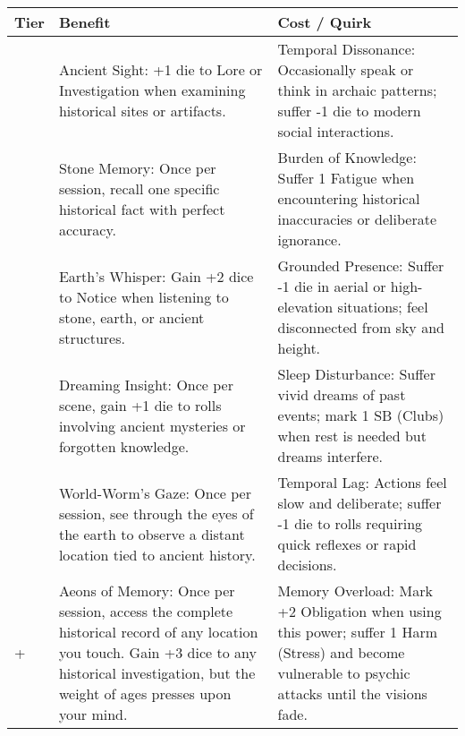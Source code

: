 \begin{longtable}{>{\raggedright\arraybackslash}p{1cm} p{5cm} p{5cm}}
\toprule
\textbf{Tier} & \textbf{Benefit} & \textbf{Cost / Quirk} \\
\midrule
1 & Ancient Sight: +1 die to Lore or Investigation when examining historical sites or artifacts. & Temporal Dissonance: Occasionally speak or think in archaic patterns; suffer -1 die to modern social interactions. \\
\midrule
2 & Stone Memory: Once per session, recall one specific historical fact with perfect accuracy. & Burden of Knowledge: Suffer 1 Fatigue when encountering historical inaccuracies or deliberate ignorance. \\
\midrule
3 & Earth's Whisper: Gain +2 dice to Notice when listening to stone, earth, or ancient structures. & Grounded Presence: Suffer -1 die in aerial or high-elevation situations; feel disconnected from sky and height. \\
\midrule
4 & Dreaming Insight: Once per scene, gain +1 die to rolls involving ancient mysteries or forgotten knowledge. & Sleep Disturbance: Suffer vivid dreams of past events; mark 1 SB (Clubs) when rest is needed but dreams interfere. \\
\midrule
5 & World-Worm's Gaze: Once per session, see through the eyes of the earth to observe a distant location tied to ancient history. & Temporal Lag: Actions feel slow and deliberate; suffer -1 die to rolls requiring quick reflexes or rapid decisions. \\
\midrule
6+ & Aeons of Memory: Once per session, access the complete historical record of any location you touch. Gain +3 dice to any historical investigation, but the weight of ages presses upon your mind. & Memory Overload: Mark +2 Obligation when using this power; suffer 1 Harm (Stress) and become vulnerable to psychic attacks until the visions fade. \\
\bottomrule
\end{longtable}